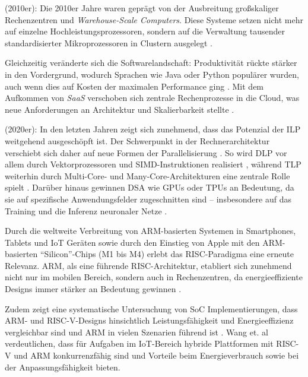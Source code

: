 (2010er): Die 2010er Jahre waren geprägt von der Ausbreitung großskaliger Rechenzentren und \textit{Warehouse-Scale Computers}. Diese Systeme setzen nicht mehr auf einzelne Hochleistungsprozessoren, sondern auf die Verwaltung tausender standardisierter Mikroprozessoren in Clustern ausgelegt \parencites[S.~6]{hennessy_computer_2011}[S.~158]{kanev_profiling_2015}[S.~29]{mars_heterogeneity_2011}.

Gleichzeitig veränderte sich die Softwarelandschaft: Produktivität rückte stärker in den Vordergrund, wodurch Sprachen wie Java oder Python populärer wurden, auch wenn dies auf Kosten der maximalen Performance ging \parencite[S.~2]{hennessy_computer_2011}. Mit dem Aufkommen von \textit{\ac{SaaS}} verschoben sich zentrale Rechenprozesse in die Cloud, was neue Anforderungen an Architektur und Skalierbarkeit stellte \parencites[S.~158]{kanev_profiling_2015}[S.~29]{mars_heterogeneity_2011}.

(2020er): In den letzten Jahren zeigt sich zunehmend, dass das Potenzial der \ac{ILP} weitgehend ausgeschöpft ist. Der Schwerpunkt in der Rechnerarchitektur verschiebt sich daher auf neue Formen der Parallelisierung \parencite[S.~10]{hennessy_computer_2019}. So wird \ac{DLP} vor allem durch Vektorprozessoren und \ac{SIMD}-Instruktionen realisiert \parencite[S.~1]{israel_high_2024}, während \ac{TLP} weiterhin durch Multi-Core- und Many-Core-Architekturen eine zentrale Rolle spielt \parencite[S.~10]{hennessy_computer_2019}. Darüber hinaus gewinnen \ac{DSA} wie GPUs oder \ac{TPU}s an Bedeutung, da sie auf spezifische Anwendungsfelder zugeschnitten sind – insbesondere auf das Training und die Inferenz neuronaler Netze \parencite[S.~10]{hennessy_computer_2019}.

Durch die weltweite Verbreitung von ARM-basierten Systemen in Smartphones, Tablets und \ac{IoT} Geräten sowie durch den Einstieg von Apple mit den ARM-basierten \enquote{Silicon}-Chips (M1 bis M4) \parencite[S.~1]{hubner_apple_2025} erlebt das \ac{RISC}-Paradigma eine erneute Relevanz. ARM, als eine führende \ac{RISC}-Architektur, etabliert sich zunehmend nicht nur im mobilen Bereich, sondern auch in Rechenzentren, da energieeffiziente Designs immer stärker an Bedeutung gewinnen \parencite[S.~817]{rahman_redefining_2024}.

Zudem zeigt eine systematische Untersuchung von \ac{SoC} Implementierungen, dass ARM- und RISC-V-Designs hinsichtlich Leistungsfähigkeit und Energieeffizienz vergleichbar sind und ARM in vielen Szenarien führend ist \parencite[S.~12771]{suarez_comprehensive_2024}. Wang et. al~\cite{wang_fann--mcu_2020} verdeutlichen, dass für Aufgaben im \ac{IoT}-Bereich hybride Plattformen mit RISC-V und ARM konkurrenzfähig sind und Vorteile beim Energieverbrauch sowie bei der Anpassungsfähigkeit bieten. 

